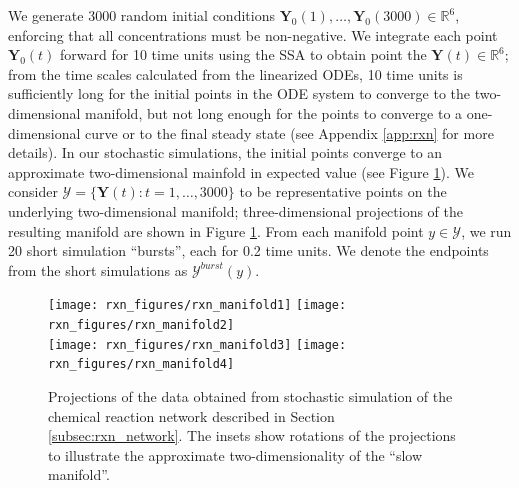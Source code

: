 \documentclass[aip,jcp,preprint]{revtex4-1}
\begin{document}
We generate 3000 random initial conditions $\mathbf{Y}_0(1), \dots, \mathbf{Y}_0(3000) \in \mathbb{R}^6$, enforcing that all concentrations must be non-negative.
%
We integrate each point $\mathbf{Y}_0(t)$ forward for 10 time units using the SSA to obtain point the $\mathbf{Y}(t) \in \mathbb{R}^6$;
from the time scales calculated from the linearized ODEs, 10 time units is sufficiently long for the initial points in the ODE system to converge to the two-dimensional manifold,
but not long enough for the points to converge to a one-dimensional curve or to the final steady state (see Appendix \ref{app:rxn} for more details).
%
In our stochastic simulations, the initial points converge to an approximate two-dimensional mainfold in expected value (see Figure \ref{fig:rxn_manifolds}).
%
We consider $\mathcal{Y} = \{ \mathbf{Y}(t): t=1, \dots, 3000 \}$ to be representative points on the underlying two-dimensional manifold;
three-dimensional projections of the resulting manifold are shown in Figure \ref{fig:rxn_manifolds}.
%
From each manifold point $y \in \mathcal{Y}$, we run 20 short simulation ``bursts'', each for 0.2 time units.
%
We denote the endpoints from the short simulations as $\mathcal{Y}^{burst}(y)$.

\begin{figure}[ht]
  \texttt{[image: rxn\_figures/rxn\_manifold1]}
  \texttt{[image: rxn\_figures/rxn\_manifold2]} \\
  \texttt{[image: rxn\_figures/rxn\_manifold3]}
  \texttt{[image: rxn\_figures/rxn\_manifold4]} \\
    \caption{Projections of the data obtained from stochastic simulation of the chemical reaction network described in Section \ref{subsec:rxn_network}. The insets show rotations of the projections to illustrate the approximate two-dimensionality of the ``slow manifold''.}
    \label{fig:rxn_manifolds}
\end{figure}
\end{document}
